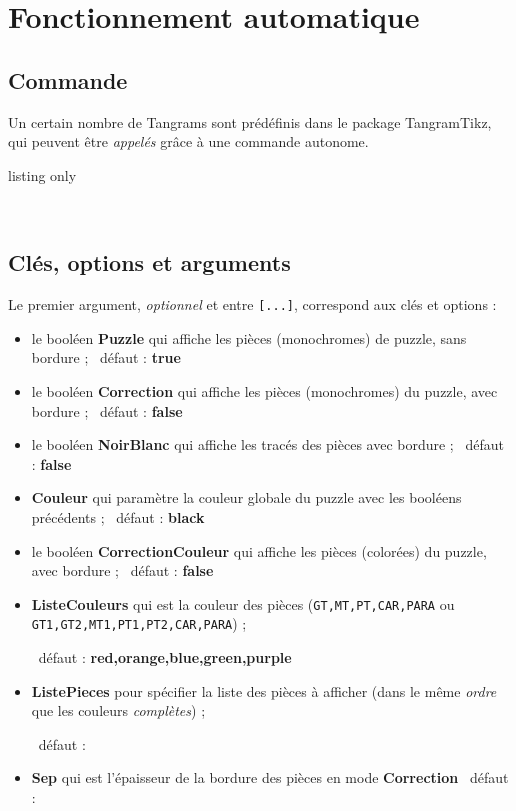 \documentclass{article}
\newcommand\Cle[1]{{\bfseries\sffamily\textlangle #1\textrangle}}
\begin{document}
\pagebreak

\section{Fonctionnement \og automatique \fg}

\subsection{Commande}

Un certain nombre de Tangrams sont prédéfinis dans le package \textsf{TangramTikz}, qui peuvent être \textit{appelés} grâce à une commande autonome.

\begin{PresentationCode}{listing only}
\end{PresentationCode}

\begin{PresentationCode}{}
~~~~
\end{PresentationCode}

\subsection{Clés, options et arguments}

Le premier argument, \textit{optionnel} et entre \texttt{[...]}, correspond aux clés et options :

\begin{itemize}
	\item le booléen \Cle{Puzzle} qui affiche les pièces (monochromes) de puzzle, sans bordure ; \hfill~défaut : \Cle{true}
	\item le booléen \Cle{Correction} qui affiche les pièces (monochromes) du puzzle, avec bordure ; \hfill~défaut : \Cle{false}
	\item le booléen \Cle{NoirBlanc} qui affiche les tracés des pièces avec bordure ; \hfill~défaut : \Cle{false}
	\item \Cle{Couleur} qui paramètre la couleur globale du puzzle avec les booléens précédents ; \hfill~défaut : \Cle{black}
	\item le booléen \Cle{CorrectionCouleur} qui affiche les pièces (colorées) du puzzle, avec bordure ; \hfill~défaut : \Cle{false}
	\item \Cle{ListeCouleurs} qui est la couleur des pièces (\texttt{GT,MT,PT,CAR,PARA} ou \texttt{GT1,GT2,MT1,PT1,PT2,CAR,PARA}) ;
	
	\hfill~défaut : \Cle{red,orange,blue,green,purple}
	\item \Cle{ListePieces} pour spécifier la liste des pièces à afficher (dans le même \textit{ordre} que les couleurs \textit{complètes}) ;
	
	\hfill~défaut : \Cle{1234567}
	\item \Cle{Sep} qui est l'épaisseur de la bordure des pièces en mode \Cle{Correction} \hfill~défaut : \Cle{1pt}
\end{itemize}
\end{document}
